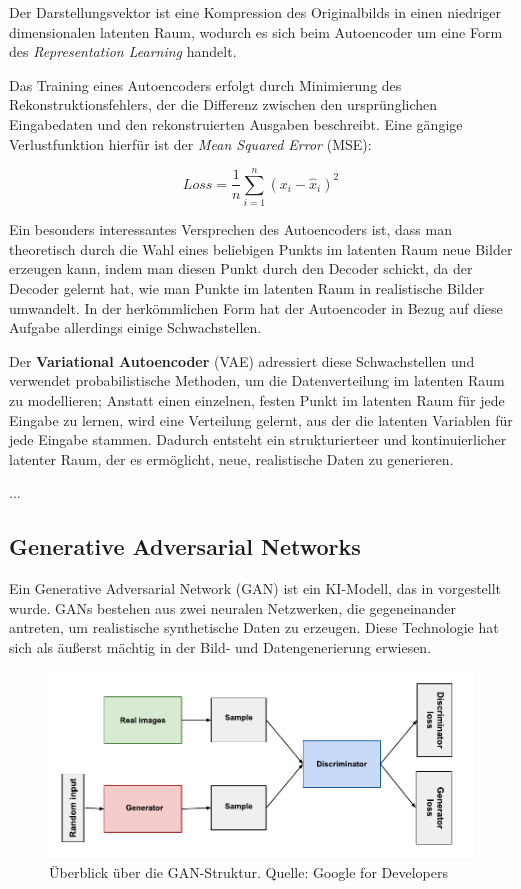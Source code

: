 Der Darstellungsvektor ist eine Kompression des Originalbilds in einen niedriger dimensionalen latenten Raum, wodurch es sich beim Autoencoder um eine Form des \textit{Representation Learning} handelt.

Das Training eines Autoencoders erfolgt durch Minimierung des Rekonstruktionsfehlers, der die Differenz zwischen den ursprünglichen Eingabedaten und den rekonstruierten Ausgaben beschreibt. Eine gängige Verlustfunktion hierfür ist der \textit{Mean Squared Error} (MSE):

\begin{equation} \label{eq-loss-mse}
	Loss=\frac{1}{n}\sum_{i=1}^n (x_i-\hat{x}_i)^2
\end{equation}

Ein besonders interessantes Versprechen des Autoencoders ist, dass man theoretisch durch die Wahl eines beliebigen Punkts im latenten Raum neue Bilder erzeugen kann, indem man diesen Punkt durch den Decoder schickt, da der Decoder gelernt hat, wie man Punkte im latenten Raum in realistische Bilder umwandelt. \parencite{Foster2020} In der herkömmlichen Form hat der Autoencoder in Bezug auf diese Aufgabe allerdings einige Schwachstellen.

Der \textbf{Variational Autoencoder} (VAE) adressiert diese Schwachstellen und verwendet probabilistische Methoden, um die Datenverteilung im latenten Raum zu modellieren; Anstatt einen einzelnen, festen Punkt im latenten Raum für jede Eingabe zu lernen, wird eine Verteilung gelernt, aus der die latenten Variablen für jede Eingabe stammen. Dadurch entsteht ein strukturierteer und kontinuierlicher latenter Raum, der es ermöglicht, neue, realistische Daten zu generieren. %

...

\subsection{Generative Adversarial Networks} \label{subsec-gan}

Ein Generative Adversarial Network (GAN) ist ein KI-Modell, das in \cite{} vorgestellt wurde. GANs bestehen aus zwei neuralen Netzwerken, die gegeneinander antreten, um realistische synthetische Daten zu erzeugen. Diese Technologie hat sich als äußerst mächtig in der Bild- und Datengenerierung erwiesen.

\begin{figure}[h]
	\label{figure-gan}
	\includegraphics{figure_gan.pdf}
	\caption{Überblick über die GAN-Struktur. Quelle: Google for Developers}
\end{figure}

